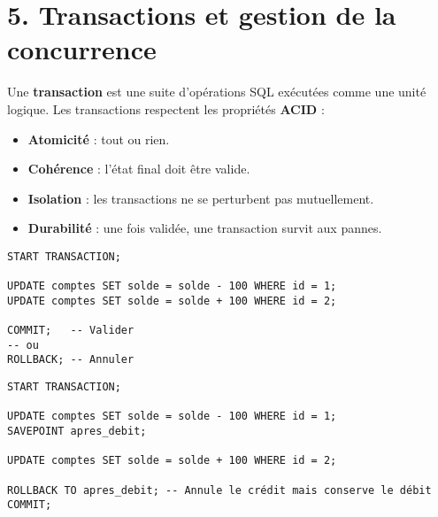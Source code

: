 \documentclass[a4paper,11pt]{article}
\begin{document}
\section*{5. Transactions et gestion de la concurrence}

\begin{tcolorbox}[colback=blue!5!white,colframe=blue!75!black,title=Notion de transaction]
Une \textbf{transaction} est une suite d’opérations SQL exécutées comme une unité logique.  
Les transactions respectent les propriétés \textbf{ACID} :
\begin{itemize}
  \item \textbf{Atomicité} : tout ou rien.
  \item \textbf{Cohérence} : l’état final doit être valide.
  \item \textbf{Isolation} : les transactions ne se perturbent pas mutuellement.
  \item \textbf{Durabilité} : une fois validée, une transaction survit aux pannes.
\end{itemize}
\end{tcolorbox}

\begin{tcolorbox}[colback=green!5!white,colframe=green!75!black,title=Syntaxe de base des transactions]
\begin{verbatim}
START TRANSACTION;

UPDATE comptes SET solde = solde - 100 WHERE id = 1;
UPDATE comptes SET solde = solde + 100 WHERE id = 2;

COMMIT;   -- Valider
-- ou
ROLLBACK; -- Annuler
\end{verbatim}
\end{tcolorbox}

\begin{tcolorbox}[colback=yellow!5!white,colframe=yellow!75!black,title=Points de sauvegarde (SAVEPOINT)]
\begin{verbatim}
START TRANSACTION;

UPDATE comptes SET solde = solde - 100 WHERE id = 1;
SAVEPOINT apres_debit;

UPDATE comptes SET solde = solde + 100 WHERE id = 2;

ROLLBACK TO apres_debit; -- Annule le crédit mais conserve le débit
COMMIT;
\end{verbatim}
\end{tcolorbox}
\end{document}
